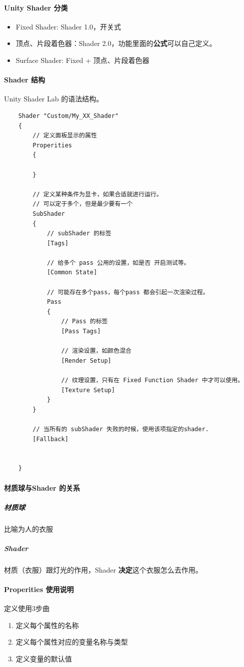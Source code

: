 \documentclass[UTF8,a4paper,12pt]{ctexbook}
\begin{document}
		\paragraph{Unity Shader 分类}
			\begin{itemize}
				\item Fixed Shader: Shader 1.0，开关式
				\item 顶点、片段着色器：Shader 2.0，功能里面的\textbf{公式}可以自己定义。
				\item Surface Shader: Fixed + 顶点、片段着色器
			\end{itemize}	
				
		\paragraph{Shader 结构}
			Unity Shader Lab 的语法结构。
			\begin{lstlisting}
	Shader "Custom/My_XX_Shader"
	{
		// 定义面板显示的属性
		Properities
		{
			
		}
		
		// 定义某种条件为显卡，如果合适就进行运行。
		// 可以定于多个，但是最少要有一个
		SubShader
		{
			// subShader 的标签
			[Tags]
			
			// 给多个 pass 公用的设置，如是否 开启测试等。
			[Common State]
			
			// 可能存在多个pass，每个pass 都会引起一次渲染过程。
			Pass
			{
				// Pass 的标签
				[Pass Tags]
				
				// 渲染设置，如颜色混合
				[Render Setup]
				
				// 纹理设置，只有在 Fixed Function Shader 中才可以使用。
				[Texture Setup]
			}
		}
		
		// 当所有的 subShader 失败的时候，使用该项指定的shader.
		[Fallback]
		
		
	}
			\end{lstlisting}
			
		
		\paragraph{材质球与Shader 的关系}
			\subparagraph{材质球}
				比喻为人的衣服
			
			\subparagraph{Shader}
				材质（衣服）跟灯光的作用，Shader \textbf{决定}这个衣服怎么去作用。
								
		
		\paragraph{Properities 使用说明}
			定义使用3步曲
			\begin{enumerate}
				\item 定义每个属性的名称
				\item 定义每个属性对应的变量名称与类型
				\item 定义变量的默认值
			\end{enumerate}
		
\end{document}
